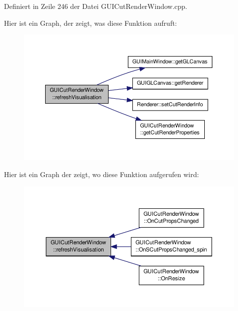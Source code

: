 Definiert in Zeile 246 der Datei G\-U\-I\-Cut\-Render\-Window.\-cpp.



Hier ist ein Graph, der zeigt, was diese Funktion aufruft\-:\nopagebreak
\begin{figure}[H]
\begin{center}
\leavevmode
\includegraphics[width=350pt]{classGUICutRenderWindow_a525891e3dde6ffd445bfed747dcee970_cgraph}
\end{center}
\end{figure}




Hier ist ein Graph der zeigt, wo diese Funktion aufgerufen wird\-:\nopagebreak
\begin{figure}[H]
\begin{center}
\leavevmode
\includegraphics[width=350pt]{classGUICutRenderWindow_a525891e3dde6ffd445bfed747dcee970_icgraph}
\end{center}
\end{figure}


